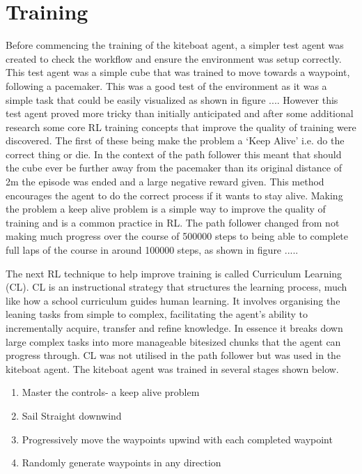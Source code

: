 \section{Training}\label{sec:training}
Before commencing the training of the kiteboat agent, a simpler test agent was created to check the workflow and ensure the environment was setup correctly. This test agent was a simple cube that was trained to move towards a waypoint, following a pacemaker. This was a good test of the environment as it was a simple task that could be easily visualized as shown in figure .... However this test agent proved more tricky than initially anticipated and after some additional research some core RL training concepts that improve the quality of training were discovered. The first of these being make the problem a `Keep Alive' i.e. do the correct thing or die. In the context of the path follower this meant that should the cube ever be further away from the pacemaker than its original distance of 2m the episode was ended and a large negative reward given. This method encourages the agent to do the correct process if it wants to stay alive. Making the problem a keep alive problem is a simple way to improve the quality of training and is a common practice in RL. The path follower changed from not making much progress over the course of 500000 steps to being able to complete full laps of the course in around 100000 steps, as shown in figure  .....

The next RL technique to help improve training is called Curriculum Learning (CL). CL is an instructional strategy that structures the learning process, much like how a school curriculum guides human learning. It involves organising the leaning tasks from simple to complex, facilitating the agent's ability to incrementally acquire, transfer and refine knowledge. In essence it breaks down large complex tasks into more manageable bitesized chunks that the agent can progress through. CL was not utilised in the path follower but was used in the kiteboat agent. The kiteboat agent was trained in several stages shown below.
\begin{enumerate}
    \item Master the controls- a keep alive problem
    \item Sail Straight downwind
    \item Progressively move the waypoints upwind with each completed waypoint
    \item Randomly generate waypoints in any direction 
\end{enumerate}

